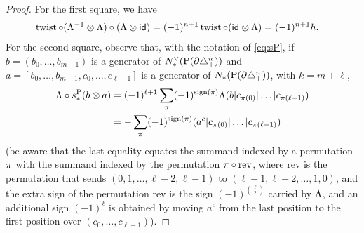 \begin{proof}
	For the first square, we have
	\begin{align*}
		\operatorname{twist}\circ(\Lambda^{-1} \otimes \Lambda)\circ (\Lambda \otimes \mathsf{id})
		&= (-1)^{n+1} \operatorname{twist}\circ(\mathsf{id} \otimes \Lambda)
		= (-1)^{n+1} h.
	\end{align*}
	For the second square, observe that, with the notation of \eqref{eq:sP}, if $b = (b_0,\dots,b_{m-1})$ is a generator of $N^\vee_{*}(\operatorname{P}(\partial\triangle_{+}^n))$ and $a = [b_0,\dots,b_{m-1},c_0,\dots,c_{\ell-1}]$ is a generator of $N_{*}(\operatorname{P}(\partial\triangle_{+}^n))$, with $k=m+\ell$,
	\begin{equation}\label{eq:lastsign}
		\begin{split}
			\Lambda\circ s_*^{\operatorname{P}} (b \otimes a)
			&= (-1)^{\ell+1}\sum_{\pi} (-1)^{\operatorname{sign}(\pi)} \Lambda(b|c_{\pi(0)}|\dots|c_{\pi(\ell-1)})
			\\
			&= -\sum_{\pi} (-1)^{\operatorname{sign}(\pi)} (a^c|c_{\pi(0)}|\dots|c_{\pi(\ell-1)})
		\end{split}
	\end{equation}
	(be aware that the last equality equates the summand indexed by a permutation $\pi$ with the summand indexed by the permutation $\pi\circ \mathrm{rev}$, where $\mathrm{rev}$ is the permutation that sends $(0,1,\dots,\ell-2,\ell-1)$ to $(\ell-1,\ell-2,\dots,1,0)$, and the extra sign of the permutation $\mathrm{rev}$ is the sign $(-1)^{\binom{\ell}{2}}$ carried by $\Lambda$, and an additional sign $(-1)^{\ell}$ is obtained by moving $a^c$ from the last position to the first position over $(c_0,\dots,c_{\ell-1})$).


\end{proof}
